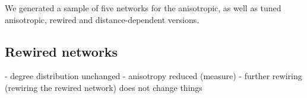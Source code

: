
We generated a sample of five networks for the anisotropic, as well as tuned anisotropic, rewired and distance-dependent versions.


\subsection{Rewired networks}

- degree distribution unchanged
- anisotropy reduced (measure)
- further rewiring (rewiring the rewired network) does not change things